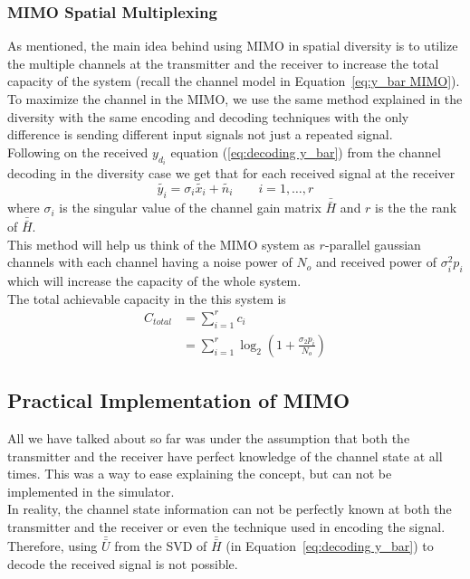 \subsubsection{MIMO Spatial Multiplexing}
As mentioned, the main idea behind using MIMO in spatial diversity is to utilize the multiple channels at the transmitter and the receiver to increase the total capacity of the system (recall the channel model in Equation~\ref{eq:y_bar MIMO}). \\

To maximize the channel in the MIMO, we use the same method explained in the diversity with the same encoding and decoding techniques with the only difference is sending different input signals not just a repeated signal. \\
Following on the received $y_{d_i}$ equation (\ref{eq:decoding y_bar}) from the channel decoding in the diversity case we get that for each received signal at the receiver
\[ \tilde{y_i} = \sigma_i \tilde{x_i} + \tilde{n_i} \qquad i=1,\ldots,r \]
where $\sigma_i$ is the singular value of the channel gain matrix $\bar{\bar{H}}$ and $r$ is the the rank of $\bar{\bar{H}}$.\\
This method will help us think of the MIMO system as $r$-parallel gaussian channels with each channel having a noise power of $N_o$ and received power of $\sigma_i^2 p_i$ which will increase the capacity of the whole system. \\
The total achievable capacity in the this system is
\begin{equation}
    \label{eq:C sum in perfect knowledge}
    \begin{aligned}
        C_{total} &= \sum_{i=1}^{r} c_i \\
        &= \sum_{i=1}^{r} \log_2 \left( 1 + \frac{\sigma_2 p_i}{N_o} \right)
    \end{aligned}
\end{equation}

\subsection{Practical Implementation of MIMO}
All we have talked about so far was under the assumption that both the transmitter and the receiver have perfect knowledge of the channel state at all times. This was a way to ease explaining the concept, but can not be implemented in the simulator.\\

In reality, the channel state information can not be perfectly known at both the transmitter and the receiver or even the technique used in encoding the signal. Therefore, using $\bar{\bar{U}}$ from the SVD of $\bar{\bar{H}}$ (in Equation~\ref{eq:decoding y_bar}) to decode the received signal is not possible.
